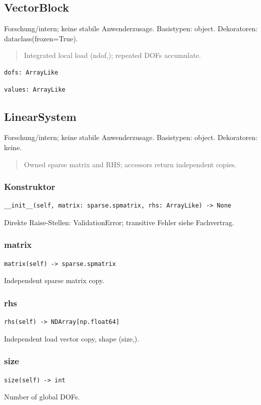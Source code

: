 \subsection{VectorBlock}
Forschung/intern; keine stabile Anwenderzusage.
Basistypen: object. Dekoratoren: dataclass(frozen=True).
\begin{quote}
Integrated local load (ndof,); repeated DOFs accumulate.
\end{quote}
\begin{lstlisting}
dofs: ArrayLike
\end{lstlisting}
\begin{lstlisting}
values: ArrayLike
\end{lstlisting}
\subsection{LinearSystem}
Forschung/intern; keine stabile Anwenderzusage.
Basistypen: object. Dekoratoren: keine.
\begin{quote}
Owned sparse matrix and RHS; accessors return independent copies.
\end{quote}
\subsubsection*{Konstruktor}
\begin{lstlisting}
__init__(self, matrix: sparse.spmatrix, rhs: ArrayLike) -> None
\end{lstlisting}
Direkte Raise-Stellen: ValidationError; transitive Fehler siehe Fachvertrag.
\subsubsection*{matrix}
\begin{lstlisting}
matrix(self) -> sparse.spmatrix
\end{lstlisting}
Independent sparse matrix copy.
\subsubsection*{rhs}
\begin{lstlisting}
rhs(self) -> NDArray[np.float64]
\end{lstlisting}
Independent load vector copy, shape (size,).
\subsubsection*{size}
\begin{lstlisting}
size(self) -> int
\end{lstlisting}
Number of global DOFs.
